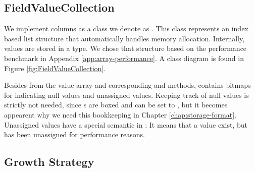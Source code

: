 



\subsection{FieldValueCollection}
\label{sub:FieldValueCollection}

We implement columns as a class we denote as . This class represents an index based list structure that automatically handles memory allocation. Internally, values are stored in a  type. We chose that structure based on the performance benchmark in Appendix \ref{app:array-performance}. A class diagram is found in Figure \ref{fig:FieldValueCollection}. 

Besides from the value array and corresponding  and  methods,  contains bitmaps for indicating null values and unassigned values. Keeping track of null values is strictly not needed, since s are boxed and can be set to \nil, but it becomes appearent why we need this bookkeeping in Chapter \ref{chap:storage-format}. Unassigned values have a special semantic in \gap: It means that a value exist, but has been unassigned for performance reasons. 

\subsection{Growth Strategy}
\label{sub:Growth Strategy}

